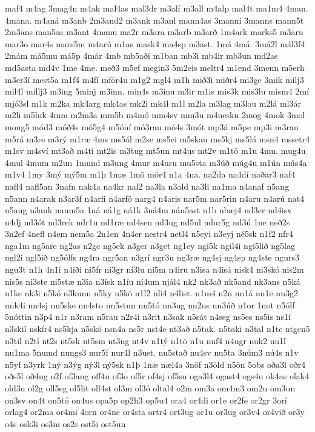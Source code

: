 {maf4
m4ag
3mag4n
m4ak
mal4as
mal3dr
m3alf
m3all
m4alp
mal4t
ma1m4
4man.
4mana.
m4aná
m3anb
2m3and2
m3ank
m3anl
mann4as
3manni
3manns
mann5t
2m3ans
man5sa
m3ant
4manu
ma2r
m3ara
m3arb
m3arð
1m4ark
marks5
m3arn
mar3o
mar4s
mars5m
m4arú
m1as
mask4
ma4sp
m3ast.
1má
4má.
3má2l
mál3f4
2mám
má5mu
má5p
4már
4mb
mb5aði
m1ban
mb3i
mb4ir
mb3un
md2as
md5asta
md4v
1me
4me.
með3
m5ef
megin3
5m2eis
meltr4
m1end
3menn
m5erh
m3er3í
mest5a
m1f4
m4fí
mför4u
m1g2
mgl4
m1h
mið3i
miðr4
mi3ge
3mik
milj3
mil4l
millj3
m3ing
5minj
m3inn.
min4s
m3inu
m3ir
m1is
mis3k
mis3lu
mism4
2mí
mjó3sl
m1k
m2ka
mk4arg
mk4as
mk2i
mk4l
m1l
m2la
m3lag
m3lau
m2lá
ml3ár
m2li
m5luk
4mm
m2m3a
mm5b
m4mó
mm4sv
mm3u
m4nesku
2mog
4mok
3mol
mong5
mód3
móð4s
mó5g4
m5óní
mó3rau
mó4s
3mót
mp3á
m5pe
mp3i
m3rau
m5rá
m3re
m3rý
m1ræ
4ms
ms5ál
m2se
ms5ei
m5skau
ms5kj
ms5lá
msn4
mssetr4
m1sv
m4sví
mt3að
m4ti
mt2is
m3tug
mt5un
mt4us
mt2v
m1tö
m1u
4mu.
mug4u
4mul
4mum
m2un
1mund
m3ung
4mur
m4uru
mu5sta
m3úð
múg4u
m1ún
mús4a
m1v4
1my
3mý
mý5m
m1þ
1mæ
1mö
mör4
n1a
4na.
na2da
na4dí
naðar3
naf4
nafl4
nafl5an
3nafn
nak4a
na4kr
nal2
na3la
n3ald
na3li
na1ma
n4anaf
n5ang
n5ann
n4arak
n3ar3f
n4arfi
n4arfö
narg4
n4aris
nar5m
nar5rin
n4aru
n4arú
nat4
n5aug
n3auk
naum5a
1ná
ná1g
ná1k
3ná4m
nán5ast
n1b
nbæj4
nd3er
nd4isv
n4dj
nd3ót
nd3rek
ndr1u
nd1ræ
nd4sen
nd3ug
nd5ul
ndur5g
nd3ú
1ne
neð2s
3n2ef
4nefl
n4em
nem5a
2n1en
4n4er
nestr4
netl4
n5eyi
n3eyj
né5sk
n1f2
nfr4
nga1m
ng5are
ng2as
n2ge
ng5ek
n3ger
n3get
ng1ey
ngi5k
ngil4i
ngi5lið
ng5lag
ngl2i
ngl5ið
ng5ólfs
ng4ra
ngr5an
n3grí
ngr3u
ng3ræ
ng4sj
ng4sp
ng4ste
ngurs3
ngu3t
n1h
4n1i
n4iði
ni5fr
ni3gr
ni3lu
ni5m
n4iru
n3isa
n4isá
nisk4
ni3skó
nis2m
nis5s
ni3ste
ni5stæ
n3ía
n3ísk
n1íu
ní4um
njál4
nk2
nk3að
nk5and
nk3ans
n5ká
n1ke
nk3i
n5kó
n3kunn
n5ky
n5kö
n1l2
nli4
n4list.
n1m4
n2n
nn1á
nn1e
nn3g2
nnk4i
nn4sj
nn5ske
nn4sto
nn5stun
nn5tó
nn3ug
nn2us
nn3úð
n1or
1not
n5ólf
5nóttin
n3p4
n1r
n3ram
n5rau
n2r4i
n3rit
n3sak
n5sát
n4seg
ns5es
ns5is
ns1í
n3skil
nskír4
ns5kja
n5skö
nsn4a
ns5r
nst4e
nt3að
n5tak.
n5taki
n3tal
n1te
ntgen5
n3til
n2tí
nt2s
nt5sk
nt5sm
nt3ug
nt4v
n1tý
n1tö
n1u
nuf4
n4ugr
nuk2
nu1l
nu1ma
5numd
nungs3
nur5f
nur4l
n3ust.
nu5stað
nu4sv
nu5ta
3núm3
nú4s
n1v
n5yf
n3yrk
1ný
n3ýg
ný3l
ný5sk
n1þ
1næ
næl4a
3nöf
n3öld
n5ön
5obs
oða3l
oðr4
oðs5l
oð4ug
o2f
of3ang
off4u
of3o
of5r
of4sj
of5su
oga3l4
ogast4
ogs4u
ok4as
olak4
old3u
ol2g
oll5eg
ol5lit
oll4st
ol3m
ol3ó
oltal4
o2m
om3a
om4m3
om2u
om3un
on3sv
on4t
on5tó
on4us
opa5p
op2h3
op5u4
ora4
or4di
or1e
or2fe
or2gr
3orí
orlag4
or2ma
or4mi
4orn
or4ne
or4sta
ortr4
ort3ug
or1u
or3ug
or3v4
or4við
or3y
o4s
osk3i
os3m
os2s
ost5i
ost5un
}
